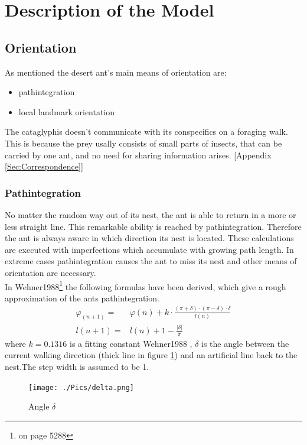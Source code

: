 \documentclass[11pt]{article}
\begin{document}
\section{Description of the Model}
\subsection{Orientation}
As mentioned the desert ant's main means of orientation are:
\begin{itemize}
\item pathintegration
\item local landmark orientation
\end{itemize}
The cataglyphis doesn't communicate with its conspecifics on a foraging walk.
This is because the prey usally consists of small parts of insects, that can be carried by one ant, and no need for sharing information arises. [Appendix \ref{Sec:Correspondence}]




\subsubsection{Pathintegration}\label{Sec:PathIntegration}
No matter the random way out of its nest, the ant is able to return in a more or less straight line. This remarkable ability is reached by pathintegration. Therefore the ant is always aware in which direction its nest is located. These calculations are executed with imperfections which accumulate with growing path length. In extreme cases pathintegration causes the ant to miss its nest and other means of orientation are necessary. \\
In Wehner1988\cite{Wehner1988}\footnote{on page 5288} the following formulas have been derived, which give a rough approximation of the ants pathintegration.
\begin{align*}
\varphi_(n+1) =& \varphi(n) +k \cdot \frac{(\pi +\delta)\cdot(\pi-\delta)\cdot \delta}{l(n)}\\
l(n+1) =& l(n) +1 -\frac{|\delta|}{\pi}
\end{align*}
where $k=0.1316$ is a fitting constant Wehner1988 \cite{Wehner1988}, $\delta$ is the angle between the current walking direction (thick line in figure \ref{fig:Delta}) and an artificial line back to the nest.The step width is assumed to be 1.

\begin{figure}[H]
\centering
\texttt{[image: ./Pics/delta.png]} 
\caption{Angle $\delta$ \label{fig:Delta} }
\end{figure} 
\end{document}
